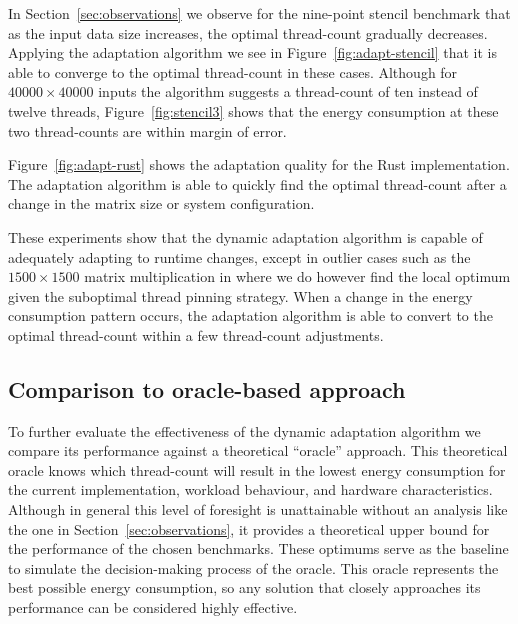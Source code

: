 In Section~\ref{sec:observations} we observe for the nine-point stencil benchmark that as the input
data size increases, the optimal thread-count gradually decreases. Applying the adaptation algorithm
we see in Figure~\ref{fig:adapt-stencil} that it is able to converge to the optimal thread-count in
these cases. Although for $40000 \times 40000$ inputs the algorithm suggests a thread-count of ten
instead of twelve threads, Figure~\ref{fig:stencil3} shows that the energy consumption at these two
thread-counts are within margin of error.

Figure~\ref{fig:adapt-rust} shows the adaptation quality for the Rust implementation. The adaptation
algorithm is able to quickly find the optimal thread-count after a change in the matrix size or
system configuration.

These experiments show that the dynamic adaptation algorithm is capable of adequately adapting to
runtime changes, except in outlier cases such as the $1500 \times 1500$ matrix multiplication in
\sac{} where we do however find the local optimum given the suboptimal thread pinning strategy. When
a change in the energy consumption pattern occurs, the adaptation algorithm is able to convert to
the optimal thread-count within a few thread-count adjustments.

\subsection{Comparison to oracle-based approach}\label{sec:evalation-oracle}

To further evaluate the effectiveness of the dynamic adaptation algorithm we compare its performance
against a theoretical ``oracle'' approach. This theoretical oracle knows which thread-count will
result in the lowest energy consumption for the current implementation, workload behaviour, and
hardware characteristics. Although in general this level of foresight is unattainable without an
analysis like the one in Section~\ref{sec:observations}, it provides a theoretical upper bound for
the performance of the chosen benchmarks. These optimums serve as the baseline to simulate the
decision-making process of the oracle. This oracle represents the best possible energy consumption,
so any solution that closely approaches its performance can be considered highly effective.

